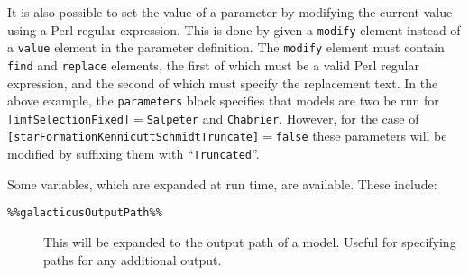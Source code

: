 It is also possible to set the value of a parameter by modifying the current value using a Perl regular expression. This is done by given a {\tt modify} element instead of a {\tt value} element in the parameter definition. The {\tt modify} element must contain {\tt find} and {\tt replace} elements, the first of which must be a valid Perl regular expression, and the second of which must specify the replacement text. In the above example, the {\tt parameters} block specifies that models are two be run for {\tt [imfSelectionFixed]}$=${\tt Salpeter} and {\tt Chabrier}. However, for the case of {\tt [starFormationKennicuttSchmidtTruncate]}$=${\tt false} these parameters will be modified by suffixing them with ``{\tt Truncated}''.

Some variables, which are expanded at run time, are available. These include:
\begin{description}
\item [{\tt \%\%galacticusOutputPath\%\%}] This will be expanded to the output path of a model. Useful for specifying paths for any additional output.
\end{description}

